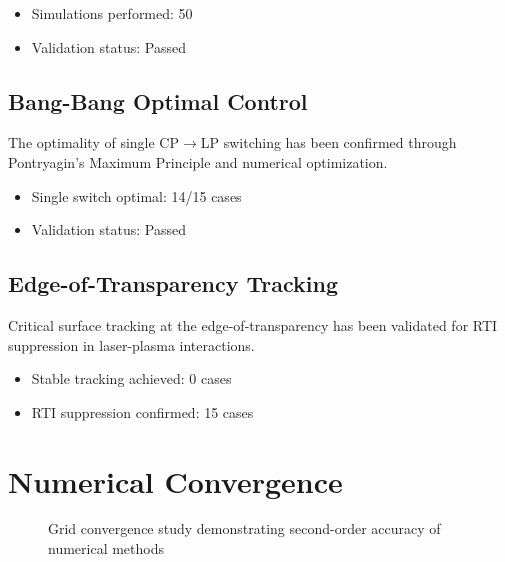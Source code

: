 \documentclass[11pt]{article}
\begin{document}
\begin{itemize}
\item Simulations performed: 50
\item Validation status: Passed
\end{itemize}


\subsection{Bang-Bang Optimal Control}

The optimality of single CP$\rightarrow$LP switching has been confirmed through Pontryagin's Maximum Principle 
and numerical optimization.

\begin{itemize}
\item Single switch optimal: 14/15 cases
\item Validation status: Passed
\end{itemize}


\subsection{Edge-of-Transparency Tracking}

Critical surface tracking at the edge-of-transparency has been validated for RTI suppression 
in laser-plasma interactions.

\begin{itemize}
\item Stable tracking achieved: 0 cases
\item RTI suppression confirmed: 15 cases
\end{itemize}


\section{Numerical Convergence}

\begin{figure}[ht]
\centering
{}
\caption{Grid convergence study demonstrating second-order accuracy of numerical methods}
\label{fig:convergence}
\end{figure}
\end{document}
